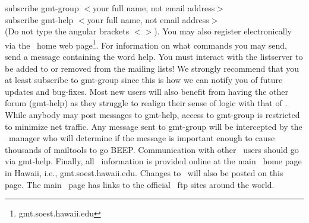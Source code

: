 \vspace{\baselineskip} 

subscribe gmt-group $<$your full name, not email address$>$ \\

subscribe gmt-help $<$your full name, not email address$>$ \\

(Do not type the angular brackets $<$$>$).  You may also
register electronically via the \GMT\ home web
page\footnote{gmt.soest.hawaii.edu}.  For information
on what commands you may send, send a message containing
the word help.  You must interact with the listserver to be
added to or removed from the mailing lists!  We strongly recommend that you
at least subscribe to gmt-group since this is how we can notify
you of future updates and bug-fixes.  Most new users will
also benefit from having the other forum (gmt-help) as they
struggle to realign their sense of logic with that of \GMT.
While anybody may post messages to gmt-help, access to gmt-group
is restricted to minimize net traffic.  Any message sent to
gmt-group will be intercepted by the \GMT\ manager who will
determine if the message is important enough to cause thousands
of mailtools to go BEEP.  Communication with other \GMT\ users
should go via gmt-help.  Finally, all \GMT\ information is provided
online at the main \GMT\ home page in Hawaii, i.e.,
gmt.soest.hawaii.edu.  Changes to \GMT\ will also be posted
on this page.  The main \GMT\ page has links to the official
\GMT\ ftp sites around the world.

